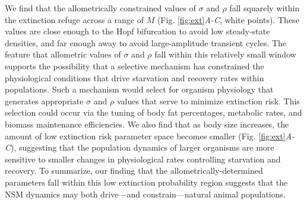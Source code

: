 \documentclass{pnastwo}
\begin{document}
\begin{article}
We find that the allometrically constrained values of $\sigma$ and $\rho$ fall squarely within the extinction refuge across a range of $M$ (Fig. \ref{fig:ext}\emph{A-C}, white points).
These values are close enough to the Hopf bifurcation to avoid low steady-state densities, and far enough away to avoid large-amplitude transient cycles.
The feature that allometric values of $\sigma$ and $\rho$ fall within this relatively small window supports the possibility that a selective mechanism has constrained the physiological conditions that drive starvation and recovery rates within populations.
Such a mechanism would select for organism physiology that generates appropriate $\sigma$ and $\rho$ values that serve to minimize extinction risk.
This selection could occur via the tuning of body fat percentages, metabolic rates, and biomass maintenance efficiencies.
We also find that as body size increases, the amount of low extinction risk parameter space becomes smaller (Fig. \ref{fig:ext}\emph{A-C}), suggesting that the population dynamics of larger organisms are more sensitive to smaller changes in physiological rates controlling starvation and recovery.
To summarize, our finding that the allometrically-determined parameters fall within this low extinction probability region suggests that the NSM dynamics may both drive---and constrain---natural animal populations.\\







\end{article}
\end{document}

